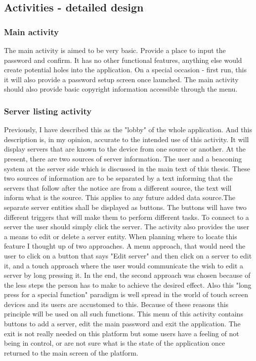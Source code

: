 \documentclass[11pt]{article} %
\begin{document}
\subsection{Activities - detailed design}

\subsubsection{Main activity}
The main activity is aimed to be very basic. Provide a place to input the password and confirm. It has no other functional features, anything else would create potential holes into the application. On a special occasion - first run, this it will also provide a password setup screen once launched. The main activity should also provide basic copyright information accessible through the menu.
\subsubsection{Server listing activity}
Previously, I have described this as the "lobby" of the whole application. And this description is, in my opinion, accurate to the intended use of this activity. It will display servers that are known to the device from one source or another. At the present, there are two sources of server information. The user and a beaconing system at the server side which is discussed in the main text of this thesis. These two sources of information are to be separated by a text informing that the servers that follow after the notice are from a different source, the text will inform what is the source. This applies to any future added data source.The separate server entities shall be displayed as buttons. The buttons will have two different triggers that will make them to perform different tasks. To connect to a server the user should simply click the server. The activity also provides the user a means to edit or delete a server entity. When planning where to locate this feature I thought up of two approaches. A menu approach, that would need the user to click on a button that says "Edit server" and then click on a server to edit it, and a touch approach where the user would communicate the wish to edit a server by long pressing it. In the end, the second approach was chosen because of the less steps the person has to make to achieve the desired effect. Also this "long press for a special function" paradigm is well spread in the world of touch screen devices and its users are accustomed to this. Because of these reasons this principle will be used on all such functions.
This menu of this activity contains buttons to add a server, edit the main password and exit the application. The exit is not really needed on this platform but some users have a feeling of not being in control, or are not sure what is the state of the application once returned to the main screen of the platform.  
\end{document}
